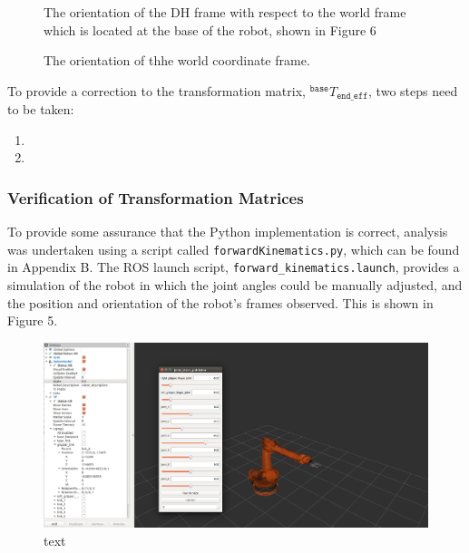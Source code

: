 \documentclass[a4paper]{article}
\begin{document}
\begin{figure}[h]
	\centering
	\begin{minipage}[t]{0.45\textwidth}
		\centering
		\caption{The orientation of the DH frame with respect to the world frame which is located at the base of the robot, shown in Figure 6}
	\end{minipage}
	\hspace{1cm}
	\begin{minipage}[t]{0.45\textwidth}
		\centering
		\caption{The orientation of thhe world coordinate frame.}
	\end{minipage}
\end{figure}

To provide a correction to the transformation matrix, $^\texttt{base} T_{\texttt{end\_eff}}$, two steps need to be taken:
\begin{enumerate}
	\item 
	\item 
\end{enumerate}

\subsubsection{Verification of Transformation Matrices}
To provide some assurance that the Python implementation is correct, analysis was undertaken using a script called \verb|forwardKinematics.py|, which can be found in Appendix B. The ROS launch script, \verb|forward_kinematics.launch|, provides a simulation of the robot in which the joint angles could be manually adjusted, and the position and orientation of the robot's frames observed. This is shown in Figure 5.

\begin{figure}[h]
	\centering
	\includegraphics[scale=0.2]{rviz_fk_debug}
	\caption{text}
\end{figure}
\end{document}
